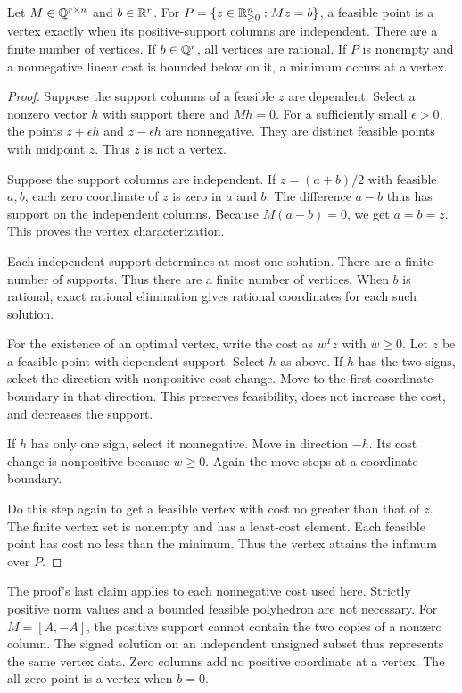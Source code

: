 \begin{lemma}\label{lem:vertices}
Let $M\in\mathbb{Q}^{r\times n}$ and $b\in\mathbb{R}^r$.
For $P=\{z\in\mathbb{R}^n_{\ge0}:Mz=b\}$, a feasible point is a vertex exactly when its positive-support columns are independent.
There are a finite number of vertices.
If $b\in\mathbb{Q}^r$, all vertices are rational.
If $P$ is nonempty and a nonnegative linear cost is bounded below on it, a minimum occurs at a vertex.
\end{lemma}
\begin{proof}
Suppose the support columns of a feasible $z$ are dependent.
Select a nonzero vector $h$ with support there and $Mh=0$.
For a sufficiently small $\epsilon>0$, the points $z+\epsilon h$ and $z-\epsilon h$ are nonnegative.
They are distinct feasible points with midpoint $z$.
Thus $z$ is not a vertex.

Suppose the support columns are independent.
If $z=(a+b)/2$ with feasible $a,b$, each zero coordinate of $z$ is zero in $a$ and $b$.
The difference $a-b$ thus has support on the independent columns.
Because $M(a-b)=0$, we get $a=b=z$.
This proves the vertex characterization.

Each independent support determines at most one solution.
There are a finite number of supports.
Thus there are a finite number of vertices.
When $b$ is rational, exact rational elimination gives rational coordinates for each such solution.

For the existence of an optimal vertex, write the cost as $w^Tz$ with $w\ge0$.
Let $z$ be a feasible point with dependent support.
Select $h$ as above.
If $h$ has the two signs, select the direction with nonpositive cost change.
Move to the first coordinate boundary in that direction.
This preserves feasibility, does not increase the cost, and decreases the support.

If $h$ has only one sign, select it nonnegative.
Move in direction $-h$.
Its cost change is nonpositive because $w\ge0$.
Again the move stops at a coordinate boundary.

Do this step again to get a feasible vertex with cost no greater than that of $z$.
The finite vertex set is nonempty and has a least-cost element.
Each feasible point has cost no less than the minimum.
Thus the vertex attains the infimum over $P$.
\end{proof}

The proof's last claim applies to each nonnegative cost used here.
Strictly positive norm values and a bounded feasible polyhedron are not necessary.
For $M=[A,-A]$, the positive support cannot contain the two copies of a nonzero column.
The signed solution on an independent unsigned subset thus represents the same vertex data.
Zero columns add no positive coordinate at a vertex.
The all-zero point is a vertex when $b=0$.

